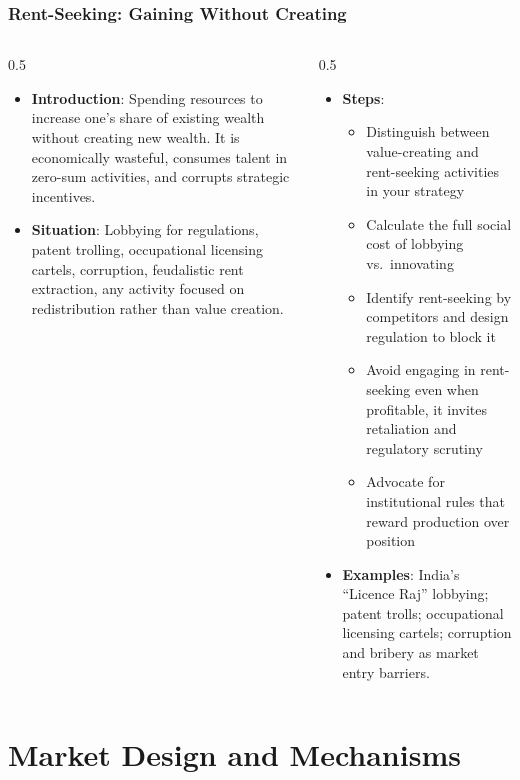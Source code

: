\begin{frame}[fragile]\frametitle{Rent-Seeking: Gaining Without Creating}
\begin{columns}
    \begin{column}[T]{0.5\linewidth}
      \begin{itemize}
        \item \textbf{Introduction}: Spending resources to increase one's share of existing wealth without creating new wealth. It is economically wasteful, consumes talent in zero-sum activities, and corrupts strategic incentives.
        \item \textbf{Situation}: Lobbying for regulations, patent trolling, occupational licensing cartels, corruption, feudalistic rent extraction, any activity focused on redistribution rather than value creation.
      \end{itemize}
    \end{column}
    \begin{column}[T]{0.5\linewidth}
      \begin{itemize}
        \item \textbf{Steps}:
        \begin{itemize}
          \item Distinguish between value-creating and rent-seeking activities in your strategy
          \item Calculate the full social cost of lobbying vs.\ innovating
          \item Identify rent-seeking by competitors and design regulation to block it
          \item Avoid engaging in rent-seeking even when profitable, it invites retaliation and regulatory scrutiny
          \item Advocate for institutional rules that reward production over position
        \end{itemize}\item \textbf{Examples}: India's ``Licence Raj'' lobbying; patent trolls; occupational licensing cartels; corruption and bribery as market entry barriers.
      \end{itemize}
    \end{column}
  \end{columns}
\end{frame}

\section{Market Design and Mechanisms}


